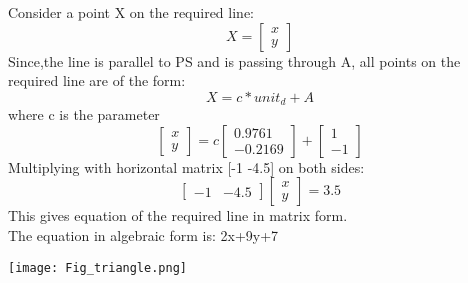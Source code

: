 \documentclass{beamer}
\begin{document}
\begin{frame}
Consider a point X on the required line:
\[
X=
\begin{bmatrix}
x\\
y
\end{bmatrix}
\]
Since,the line is parallel to PS and is passing through A,
all points on the required line are of the form:
\[
X=c*unit_d + A
\]
where c is the parameter
\[
\begin{bmatrix}
x\\
y
\end{bmatrix}
=c
\begin{bmatrix}
0.9761\\
-0.2169
\end{bmatrix}
+
\begin{bmatrix}
1\\
-1
\end{bmatrix}
\]
Multiplying with horizontal matrix [-1 -4.5] on both sides:
\[
\begin{bmatrix}
-1 & -4.5
\end{bmatrix}
\begin{bmatrix}
x\\
y
\end{bmatrix}
=
3.5
\]
This gives equation of the required line in matrix form.\\
The equation in algebraic form is: 2x+9y+7
\end{frame}

\begin{frame}
 \texttt{[image: Fig\_triangle.png]}
\end{frame}
\end{document}
